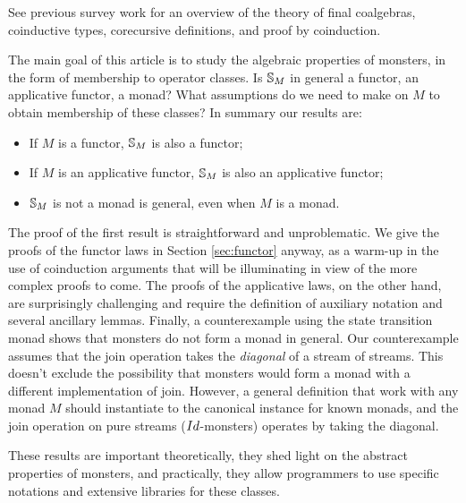 See previous survey work \cite{capretta:2011} for an overview of the theory of final coalgebras, coinductive types, corecursive definitions, and proof by coinduction.

The main goal of this article is to study the algebraic properties of monsters, in the form of membership to operator classes.
Is $\mathbb{S}_{M}$ in general a functor, an applicative functor, a monad?
What assumptions do we need to make on $M$ to obtain membership of these classes?
In summary our results are:
\begin{itemize}
\item If $M$ is a functor, $\mathbb{S}_{M}$ is also a functor;
\item If $M$ is an applicative functor, $\mathbb{S}_{M}$ is also an applicative functor;
\item $\mathbb{S}_{M}$ is not a monad is general, even when $M$ is a monad.
\end{itemize}

The proof of the first result is straightforward and unproblematic.
We give the proofs of the functor laws in Section \ref{sec:functor} anyway, as a warm-up in the use of coinduction arguments that will be illuminating in view of the more complex proofs to come.
The proofs of the applicative laws, on the other hand, are surprisingly challenging and require the definition of auxiliary notation and several ancillary lemmas.
Finally, a counterexample using the state transition monad shows that monsters do not form a monad in general. Our counterexample assumes that the join operation takes the {\em diagonal} of a stream of streams.
This doesn't exclude the possibility that monsters would form a monad with a different implementation of join.
However, a general definition that work with any monad $M$ should instantiate to the canonical instance for known monads, and the join operation on pure streams ($\Id$-monsters) operates by taking the diagonal.

These results are important theoretically, they shed light on the abstract properties of monsters, and practically, they allow programmers to use specific notations and extensive libraries for these classes.
